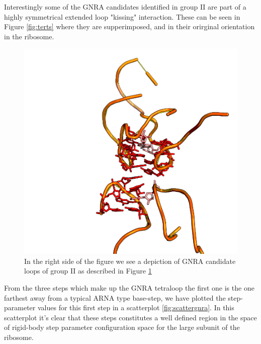 Interestingly some of the GNRA candidates identified in group II are
part    of   a    highly   symmetrical    extended    loop   "kissing"
interaction. These can be seen in Figure \ref{fig:terts} where they are supperimposed,
and in their orirginal orientation in the ribosome.

\begin{figure}
\centering 
\includegraphics[angle=0, scale=0.5]{Chapter5/four_loop.png}
\caption{In the  right side of the  figure we see a  depiction of GNRA
candidate loops of group II as described in Figure \ref{fig:groupsB}
}
\label{fig:groupsB}
\end{figure}

From the three steps which make up the GNRA tetraloop the first one is
the  one farthest away  from a  typical ARNA  type base-step,  we have
plotted the step-parameter values for this first step in a scatterplot
\ref{fig:scattergnra}. In this scatterplot it's clear that these steps
constitutes  a well  defined region  in the  space of  rigid-body step
parameter configuration space for the large subunit of the ribosome.

